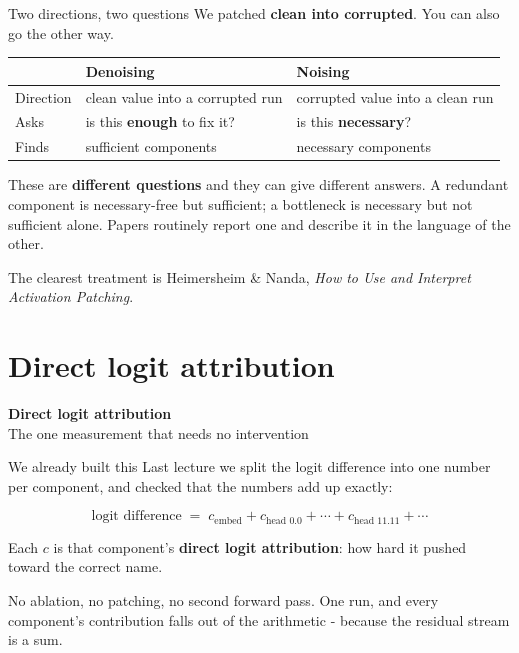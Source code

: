 \documentclass[aspectratio=169]{beamer}
\newcommand{\keybox}[1]{%
  \begin{tcolorbox}[colback=armblue!8, colframe=armblue, boxrule=0.6pt, arc=2pt]
  #1
  \end{tcolorbox}}
\newcommand{\trapbox}[1]{%
  \begin{tcolorbox}[colback=armred!8, colframe=armred, boxrule=0.6pt, arc=2pt]
  #1
  \end{tcolorbox}}
\newcommand{\sectiontransition}[2]{%
  \begin{frame}[plain]
    \vfill
    \begin{center}
      {\Huge\bfseries\color{popblue} #1}\\[1.1em]
      {\large #2}
    \end{center}
    \vfill
  \end{frame}}
\begin{document}
\begin{frame}{Two directions, two questions}
  \vspace{0.6em}
  We patched \textbf{clean into corrupted}. You can also go the other way.

  \vspace{0.7em}
  \begin{center}
  \small
  \begin{tabular}{@{}p{}p{}p{}@{}}
    \toprule
    & \textbf{Denoising} & \textbf{Noising}\\
    \midrule
    Direction & clean value into a corrupted run & corrupted value into a clean run\\[0.5em]
    Asks & is this \textbf{enough} to fix it? & is this \textbf{necessary}?\\[0.5em]
    Finds & sufficient components & necessary components\\
    \bottomrule
  \end{tabular}
  \end{center}

  \vspace{0.9em}
  \trapbox{These are \textbf{different questions} and they can give different answers. A
  redundant component is necessary-free but sufficient; a bottleneck is necessary but not
  sufficient alone. Papers routinely report one and describe it in the language of the other.}

  \vspace{0.5em}
  {\footnotesize The clearest treatment is Heimersheim \& Nanda, \emph{How to Use and Interpret
  Activation Patching}.}
\end{frame}

\section{Direct logit attribution}
\sectiontransition{Direct logit attribution}{The one measurement that needs no intervention}

\begin{frame}{We already built this}
  \vspace{0.7em}
  Last lecture we split the logit difference into one number per component, and checked that the
  numbers add up exactly:

  \vspace{0.5em}
  \[
    \text{logit difference} \;=\; c_{\text{embed}} + c_{\text{head 0.0}} + \cdots +
      c_{\text{head 11.11}} + \cdots
  \]

  \vspace{0.8em}
  Each $c$ is that component's \textbf{direct logit attribution}: how hard it pushed toward the
  correct name.

  \vspace{0.9em}
  \keybox{No ablation, no patching, no second forward pass. One run, and every component's
  contribution falls out of the arithmetic - because the residual stream is a sum.}
\end{frame}
\end{document}
